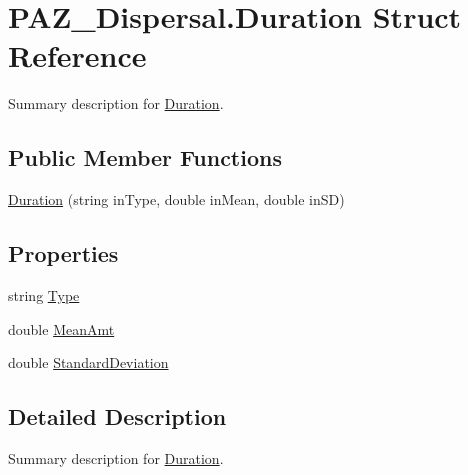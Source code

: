 \hypertarget{struct_p_a_z___dispersal_1_1_duration}{\section{P\-A\-Z\-\_\-\-Dispersal.\-Duration Struct Reference}
\label{struct_p_a_z___dispersal_1_1_duration}
}


Summary description for \hyperlink{struct_p_a_z___dispersal_1_1_duration}{Duration}.  


\subsection*{Public Member Functions}
\begin{DoxyCompactItemize}
\item 
\hyperlink{struct_p_a_z___dispersal_1_1_duration_a4b0ea90bafc2b0ea2f05074b63959894}{Duration} (string in\-Type, double in\-Mean, double in\-S\-D)
\end{DoxyCompactItemize}
\subsection*{Properties}
\begin{DoxyCompactItemize}
\item 
string \hyperlink{struct_p_a_z___dispersal_1_1_duration_af87a4a27fedd3b6a0921858186a6ca04}{Type}
\item 
double \hyperlink{struct_p_a_z___dispersal_1_1_duration_a5a1aa7ab567fb35590f43e1897780f44}{Mean\-Amt}
\item 
double \hyperlink{struct_p_a_z___dispersal_1_1_duration_ab15378e0a7c48e692b02f20c6b578c5f}{Standard\-Deviation}
\end{DoxyCompactItemize}


\subsection{Detailed Description}
Summary description for \hyperlink{struct_p_a_z___dispersal_1_1_duration}{Duration}. 



